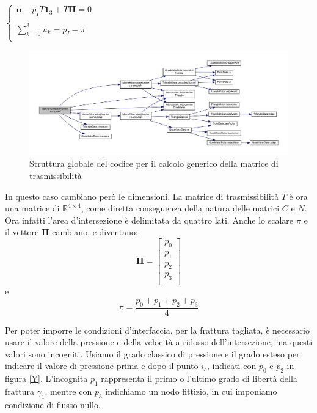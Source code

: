 \begin{center}			
	$\left \{
		\begin{array}{l}	
	 		\textbf{u} - p_{I}T\textbf{1}_{3}+T \boldsymbol{\Pi}=0  \\ \\
     	 	\displaystyle \sum_{k=0}^3 u_{k} = p_{I} - \pi  \\
		\end{array}
	\right.$
\end{center} \label{condizioni d'interfaccia y }

\begin{figure}[htbp]
\begin{center}
\includegraphics[width=1.2\textwidth]{img/cap6/dipendenze.pdf}
\caption{Struttura globale del codice per il calcolo generico della matrice di trasmissibilità}\label{dipendenze}
\end{center}
\end{figure}


\noindent In questo caso cambiano però le dimensioni. La matrice di trasmissibilità $T$ è ora una matrice di $\mathbb{R}^{4 \times 4}$, come diretta conseguenza della natura delle matrici $C$ e $N$. Ora infatti l'area d'intersezione è delimitata da quattro lati. Anche lo scalare $\pi$ e il vettore $\boldsymbol{\Pi}$ cambiano, e diventano:
$$\boldsymbol{\Pi} = \left[ \begin{matrix}
 			p_0\\ 
 			p_1\\
 			p_2 \\ 
		 	p_3 \\
 			\end{matrix}\right] 
$$ 
 e
$$ \pi = \frac{p_0 + p_1 + p_2 + p_3 }{4} $$

Per poter imporre le condizioni d'interfaccia, per la frattura tagliata, è necessario usare il valore della pressione e della velocità a ridosso dell'intersezione, ma questi valori sono incogniti. 
Usiamo il grado classico di pressione e il grado esteso per indicare il valore di pressione prima e dopo il punto $i_c$, indicati con $p_0$ e $p_2$ in figura \ref{Y}.  L'incognita $p_1$ rappresenta il primo o l'ultimo grado di libertà della frattura $\gamma_1$, mentre con $p_3$ indichiamo un nodo fittizio, in cui imponiamo condizione di flusso nullo.

